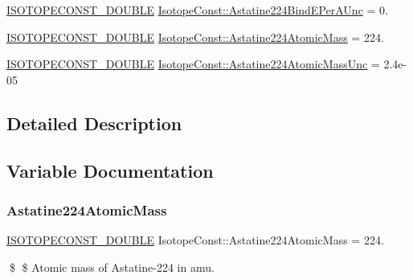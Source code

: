 \begin{DoxyCompactItemize}
\mbox{\hyperlink{group___isotope_const-_macros_ga8f45a7272ce02c0b4c65c44636ed719a}{I\+S\+O\+T\+O\+P\+E\+C\+O\+N\+S\+T\+\_\+\+D\+O\+U\+B\+LE}} \mbox{\hyperlink{group___isotope_const-_astatine-_at224_ga75f6d8175555b05b911b687ab66ae717}{Isotope\+Const\+::\+Astatine224\+Bind\+E\+Per\+A\+Unc}} = 0.
\item 
\mbox{\hyperlink{group___isotope_const-_macros_ga8f45a7272ce02c0b4c65c44636ed719a}{I\+S\+O\+T\+O\+P\+E\+C\+O\+N\+S\+T\+\_\+\+D\+O\+U\+B\+LE}} \mbox{\hyperlink{group___isotope_const-_astatine-_at224_ga0696622d638af2eca45503886f34afb5}{Isotope\+Const\+::\+Astatine224\+Atomic\+Mass}} = 224.
\item 
\mbox{\hyperlink{group___isotope_const-_macros_ga8f45a7272ce02c0b4c65c44636ed719a}{I\+S\+O\+T\+O\+P\+E\+C\+O\+N\+S\+T\+\_\+\+D\+O\+U\+B\+LE}} \mbox{\hyperlink{group___isotope_const-_astatine-_at224_gafa55f090626f3dde4c9135266efe5ca0}{Isotope\+Const\+::\+Astatine224\+Atomic\+Mass\+Unc}} = 2.\+4e-\/05
\end{DoxyCompactItemize}


\subsection{Detailed Description}


\subsection{Variable Documentation}
\mbox{\label{group___isotope_const-_astatine-_at224_ga0696622d638af2eca45503886f34afb5}} 
\subsubsection{\texorpdfstring{Astatine224\+Atomic\+Mass}{Astatine224AtomicMass}}
{\footnotesize\ttfamily \mbox{\hyperlink{group___isotope_const-_macros_ga8f45a7272ce02c0b4c65c44636ed719a}{I\+S\+O\+T\+O\+P\+E\+C\+O\+N\+S\+T\+\_\+\+D\+O\+U\+B\+LE}} Isotope\+Const\+::\+Astatine224\+Atomic\+Mass = 224.}

\$ \$ Atomic mass of Astatine-\/224 in amu. \mbox{\label{group___isotope_const-_astatine-_at224_gafa55f090626f3dde4c9135266efe5ca0}} 
